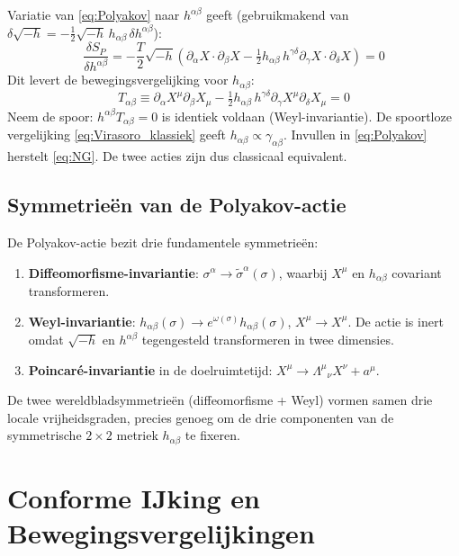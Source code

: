 \documentclass[12pt,a4paper]{article}
\begin{document}
Variatie van \eqref{eq:Polyakov} naar $h^{\alpha\beta}$ geeft (gebruikmakend van $\delta\sqrt{-h} = -\tfrac{1}{2}\sqrt{-h}\,h_{\alpha\beta}\,\delta h^{\alpha\beta}$):
\begin{equation}
  \frac{\delta S_P}{\delta h^{\alpha\beta}} = -\frac{T}{2}\sqrt{-h}\left(\partial_\alpha X\cdot\partial_\beta X - \tfrac{1}{2}h_{\alpha\beta}\,h^{\gamma\delta}\partial_\gamma X\cdot\partial_\delta X\right) = 0
\end{equation}
Dit levert de bewegingsvergelijking voor $h_{\alpha\beta}$:
\begin{equation}
  T_{\alpha\beta} \equiv \partial_\alpha X^\mu\partial_\beta X_\mu - \tfrac{1}{2}h_{\alpha\beta}\,h^{\gamma\delta}\partial_\gamma X^\mu\partial_\delta X_\mu = 0
  \label{eq:Virasoro_klassiek}
\end{equation}
Neem de spoor: $h^{\alpha\beta}T_{\alpha\beta} = 0$ is identiek voldaan (Weyl-invariantie). De spoortloze vergelijking \eqref{eq:Virasoro_klassiek} geeft $h_{\alpha\beta} \propto \gamma_{\alpha\beta}$. Invullen in \eqref{eq:Polyakov} herstelt \eqref{eq:NG}. De twee acties zijn dus classicaal equivalent.

\subsection{Symmetrie\"en van de Polyakov-actie}

De Polyakov-actie bezit drie fundamentele symmetrie\"en:
\begin{enumerate}
  \item \textbf{Diffeomorfisme-invariantie}: $\sigma^\alpha \to \tilde\sigma^\alpha(\sigma)$, waarbij $X^\mu$ en $h_{\alpha\beta}$ covariant transformeren.
  \item \textbf{Weyl-invariantie}: $h_{\alpha\beta}(\sigma) \to e^{\omega(\sigma)}h_{\alpha\beta}(\sigma)$, $X^\mu \to X^\mu$. De actie is inert omdat $\sqrt{-h}$ en $h^{\alpha\beta}$ tegengesteld transformeren in twee dimensies.
  \item \textbf{Poincar\'e-invariantie} in de doelruimtetijd: $X^\mu \to \Lambda^\mu{}_\nu X^\nu + a^\mu$.
\end{enumerate}
De twee wereldbladsymmetrie\"en (diffeomorfisme + Weyl) vormen samen drie locale vrijheidsgraden, precies genoeg om de drie componenten van de symmetrische $2\times2$ metriek $h_{\alpha\beta}$ te fixeren.

\section{Conforme IJking en Bewegingsvergelijkingen}
\end{document}
